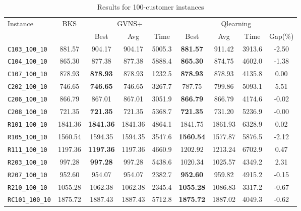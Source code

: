\begin{table}[ht]
\centering
\small
\setlength{\tabcolsep}{5pt}
\caption{Results for 100-customer instances}
\vspace{4mm}
\begin{adjustbox}{width=\textwidth}
\begin{tabular}{l c c c c @{\hspace{8pt}} c c c c @{\hspace{8pt}}}
\toprule
\multirow{2}{*}{Instance} & \multirow{2}{*}{BKS} & \multicolumn{3}{c}{GVNS+} & \multicolumn{4}{c}{Qlearning} \\
\cmidrule(lr){3-5} \cmidrule(lr){6-9}
 &  & Best & Avg & Time & Best & Avg & Time & Gap(\%) \\
\midrule
\texttt{C103\_100\_10} & 881.57 & 904.17 & 904.17 & 5005.3 & \textbf{881.57} & 911.42 & 3913.6 & -2.50 \\
\texttt{C104\_100\_10} & 865.30 & 877.38 & 877.38 & 5888.4 & \textbf{865.30} & 874.75 & 4602.0 & -1.38 \\
\texttt{C107\_100\_10} & 878.93 & \textbf{878.93} & 878.93 & 1232.5 & \textbf{878.93} & 878.93 & 4135.8 & 0.00 \\
\texttt{C202\_100\_10} & 746.65 & \textbf{746.65} & 746.65 & 3267.7 & 787.75 & 799.86 & 5093.1 & 5.51 \\
\texttt{C206\_100\_10} & 866.79 & 867.01 & 867.01 & 3051.9 & \textbf{866.79} & 866.79 & 4174.6 & -0.02 \\
\texttt{C208\_100\_10} & 721.35 & \textbf{721.35} & 721.35 & 5368.7 & \textbf{721.35} & 731.20 & 5236.9 & -0.00 \\
\texttt{R101\_100\_10} & 1841.36 & \textbf{1841.36} & 1841.36 & 4864.1 & 1841.75 & 1861.93 & 6328.9 & 0.02 \\
\texttt{R105\_100\_10} & 1560.54 & 1594.35 & 1594.35 & 3547.6 & \textbf{1560.54} & 1577.87 & 5876.5 & -2.12 \\
\texttt{R111\_100\_10} & 1197.36 & \textbf{1197.36} & 1197.36 & 4660.9 & 1202.92 & 1213.24 & 6702.9 & 0.47 \\
\texttt{R203\_100\_10} & 997.28 & \textbf{997.28} & 997.28 & 5438.6 & 1020.34 & 1025.57 & 4349.2 & 2.31 \\
\texttt{R207\_100\_10} & 952.60 & 954.07 & 954.07 & 2382.7 & \textbf{952.60} & 959.82 & 4915.2 & -0.15 \\
\texttt{R210\_100\_10} & 1055.28 & 1062.38 & 1062.38 & 2345.4 & \textbf{1055.28} & 1086.83 & 3317.2 & -0.67 \\
\texttt{RC101\_100\_10} & 1875.72 & 1887.43 & 1887.43 & 5712.8 & \textbf{1875.72} & 1887.02 & 4049.3 & -0.62 \\

\end{tabular}
\end{adjustbox}
\end{table}
